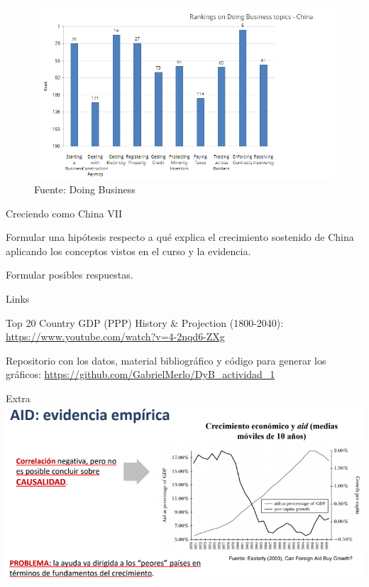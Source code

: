 \documentclass{beamer}
\let\tempone\itemize
\let\temptwo\enditemize
\renewenvironment{itemize}{\tempone\addtolength{\itemsep}{0.5\baselineskip}}{\temptwo}
\begin{document}
	\begin{frame}[plain]
		\begin{figure}
			\centering
			\includegraphics[width=\linewidth, keepaspectratio]{doing_business_rank_components} \\
			{\footnotesize{Fuente: Doing Business}}
		\end{figure}
	\end{frame}

	\begin{frame}{Creciendo como China VII}
		\begin{itemize}
			\item Formular una hipótesis respecto a qué explica el crecimiento sostenido de China aplicando los conceptos vistos en el curso y la evidencia.
			\item Formular posibles respuestas.
		\end{itemize}
	\end{frame}	

	\begin{frame}{Links}
		\begin{itemize}
			\item Top 20 Country GDP (PPP) History \& Projection (1800-2040):  \href{https://www.youtube.com/watch?v=4-2nqd6-ZXg}{https://www.youtube.com/watch?v=4-2nqd6-ZXg}
			\item Repositorio con los datos, material bibliográfico y código para generar los gráficos: \href{https://github.com/GabrielMerlo/DyB_actividad_1}{https://github.com/GabrielMerlo/DyB\_actividad\_1}
		\end{itemize}
	\end{frame}	

	\begin{frame}{Extra}
		\centering
		\includegraphics[width=\linewidth, keepaspectratio]{aid}
	\end{frame}
\end{document}
